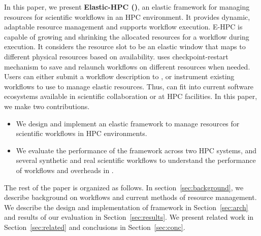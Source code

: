 In this paper, we present \textbf{Elastic-HPC (\systemname)}, an
elastic framework for managing resources for scientific workflows in
an HPC environment. It provides dynamic, adaptable resource
management and supports workflow execution. E-HPC is capable of
growing and shrinking the allocated resources for a workflow during
execution. It considers the resource slot to be an elastic window that
maps to different physical resources based on availability.
\systemname uses checkpoint-restart mechanism to save and relaunch
workflows on different resources when needed. Users can either submit a
workflow description to \systemname, or instrument existing workflows to
use \systemname to manage elastic resources. Thus, \systemname can fit
into current software ecosystems available in scientific collaboration
or at HPC facilities. In this paper, we make two contributions.

\begin{itemize}  
\item We design and implement an elastic framework to manage resources
for scientific workflows in HPC environments.
\item We evaluate the performance of the \systemname framework across two
HPC systems, and several synthetic and real scientific workflows to
understand the performance of workflows and overheads in \systemname. 
\end{itemize}  

The rest of the paper is organized as follows. In
section~\ref{sec:background}, we describe background on workflows
and current methods of resource management. We describe the
design and implementation of \systemname framework in
Section~\ref{sec:arch} and results of our evaluation in
Section~\ref{sec:results}. We present related work in
Section~\ref{sec:related} and conclusions in
Section~\ref{sec:conc}.







